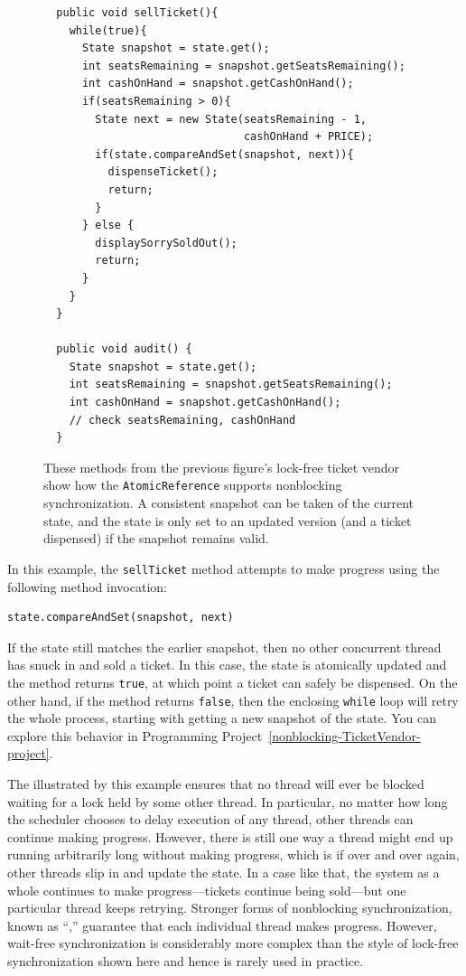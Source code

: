 \begin{figure}
\begin{verbatim}    
  public void sellTicket(){
    while(true){
      State snapshot = state.get();
      int seatsRemaining = snapshot.getSeatsRemaining();
      int cashOnHand = snapshot.getCashOnHand();
      if(seatsRemaining > 0){
        State next = new State(seatsRemaining - 1,
                               cashOnHand + PRICE);
        if(state.compareAndSet(snapshot, next)){
          dispenseTicket();
          return;
        }
      } else {
        displaySorrySoldOut();
        return;
      }
    }
  }
    
  public void audit() { 
    State snapshot = state.get();
    int seatsRemaining = snapshot.getSeatsRemaining();
    int cashOnHand = snapshot.getCashOnHand();
    // check seatsRemaining, cashOnHand
  } 
\end{verbatim}
\caption{These methods from the previous figure's lock-free ticket vendor show how the \texttt{AtomicReference} supports nonblocking synchronization.  A consistent snapshot can be taken of the current state, and the state is only set to an updated version
 (and a ticket dispensed) if the snapshot remains valid.}
\label{nonblocking-TicketVendor2}
\end{figure}

In this example, the \texttt{sellTicket} method attempts to make progress using the following method invocation:
\begin{verbatim}
state.compareAndSet(snapshot, next)
\end{verbatim}
If the state still matches the earlier snapshot, then no other concurrent thread has snuck in and sold a ticket.
In this case, the state is atomically updated and the method returns \texttt{true}, at which point a ticket can
safely be dispensed.  On the other hand, if the method returns \texttt{false}, then the enclosing \texttt{while} loop
will retry the whole process, starting with getting a new snapshot of the state.  You can explore this behavior in Programming Project~\ref{nonblocking-TicketVendor-project}.

The  illustrated by this example ensures that
no thread will ever be blocked waiting for a lock held by some other
thread.  In particular, no matter how long the scheduler chooses to
delay execution of any thread, other threads can continue making
progress.  However, there is still one way a thread might end up
running arbitrarily long without making progress, which is if over and
over again, other threads slip in and update the state.  In a case
like that, the system as a whole continues to make progress---tickets
continue being sold---but one particular thread keeps retrying.
Stronger forms of nonblocking synchronization, known as ``,'' guarantee that each individual thread makes
progress.  However, wait-free synchronization is considerably more
complex than the style of lock-free synchronization shown here
and hence is rarely used in practice.

